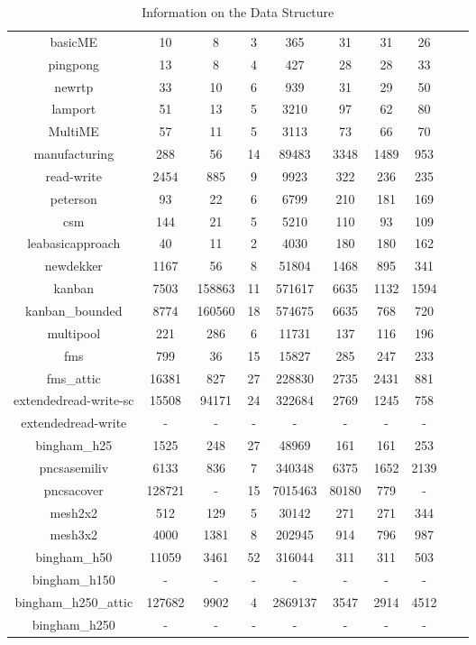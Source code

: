 \begin{table}[H]
{\begin{tabular}{c c c c c c c c c c}
\midrule
basicME & 10 & 8 & 3 & 365 & 31 & 31 & 26 \\
pingpong & 13 & 8 & 4 & 427 & 28 & 28 & 33 \\
newrtp & 33 & 10 & 6 & 939 & 31 & 29 & 50 \\
lamport & 51 & 13 & 5 & 3210 & 97 & 62 & 80 \\
MultiME & 57 & 11 & 5 & 3113 & 73 & 66 & 70 \\
manufacturing & 288 & 56 & 14 & 89483 & 3348 & 1489 & 953 \\
read-write & 2454 & 885 & 9 & 9923 & 322 & 236 & 235 \\
peterson & 93 & 22 & 6 & 6799 & 210 & 181 & 169 \\
csm & 144 & 21 & 5 & 5210 & 110 & 93 & 109 \\
leabasicapproach & 40 & 11 & 2 & 4030 & 180 & 180 & 162 \\
newdekker & 1167 & 56 & 8 & 51804 & 1468 & 895 & 341 \\
kanban & 7503 & 158863 & 11 & 571617 & 6635 & 1132 & 1594 \\
kanban\_bounded & 8774 & 160560 & 18 & 574675 & 6635 & 768 & 720 \\
multipool & 221 & 286 & 6 & 11731 & 137 & 116 & 196 \\
fms & 799 & 36 & 15 & 15827 & 285 & 247 & 233 \\
fms\_attic & 16381 & 827 & 27 & 228830 & 2735 & 2431 & 881 \\
extendedread-write-sc & 15508 & 94171 & 24 & 322684 & 2769 & 1245 & 758 \\
extendedread-write & - & - & - & - & - & - & - \\
bingham\_h25 & 1525 & 248 & 27 & 48969 & 161 & 161 & 253 \\
pncsasemiliv & 6133 & 836 & 7 & 340348 & 6375 & 1652 & 2139 \\
pncsacover & 128721 & - & 15 & 7015463 & 80180 & 779 & - \\
mesh2x2 & 512 & 129 & 5 & 30142 & 271 & 271 & 344 \\
mesh3x2 & 4000 & 1381 & 8 & 202945 & 914 & 796 & 987 \\
bingham\_h50 & 11059 & 3461 & 52 & 316044 & 311 & 311 & 503 \\
bingham\_h150 & - & - & - & - & - & - & - \\
bingham\_h250\_attic & 127682 & 9902 & 4 & 2869137 & 3547 & 2914 & 4512 \\
bingham\_h250 & - & - & - & - & - & - & - \\
        \bottomrule
\end{tabular}%
}
\caption{Information on the Data Structure}
\label{tab:mist-results-datastruct}
\end{table}


